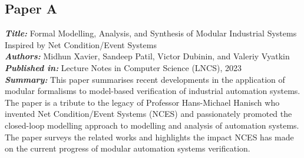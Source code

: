 \subsection{Paper A}
\textbf{\textit{Title:}} Formal Modelling, Analysis, and Synthesis of Modular Industrial Systems Inspired by Net Condition/Event Systems\\
\textbf{\textit{Authors:}} Midhun Xavier, Sandeep Patil, Victor Dubinin, and Valeriy Vyatkin\\
\textbf{\textit{Published in:}} Lecture Notes in Computer Science (LNCS), 2023\\
\textbf{\textit{Summary:}} This paper summarises recent developments in the application of modular formalisms to model-based verification of industrial automation systems. The paper is a tribute to the legacy of Professor Hans-Michael Hanisch who invented Net Condition/Event Systems (NCES) and passionately promoted the closed-loop modelling approach to modelling and analysis of automation systems. The paper surveys the related works and highlights the impact NCES has made on the current progress of modular automation systems verification.\\

